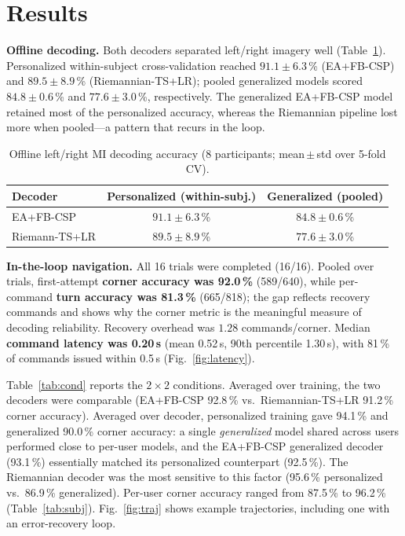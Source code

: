 \documentclass[10pt,journal]{IEEEtran}
\begin{document}
\section{Results}\label{sec:results}
\textbf{Offline decoding.} Both decoders separated left/right imagery well
(Table~\ref{tab:offline}). Personalized within-subject cross-validation reached
$91.1\pm6.3$\,\% (EA+FB-CSP) and $89.5\pm8.9$\,\% (Riemannian-TS+LR); pooled generalized models
scored $84.8\pm0.6$\,\% and $77.6\pm3.0$\,\%, respectively. The generalized EA+FB-CSP model
retained most of the personalized accuracy, whereas the Riemannian pipeline lost more when
pooled---a pattern that recurs in the loop.

\begin{table}[t]\centering
\caption{Offline left/right MI decoding accuracy (8 participants; mean\,$\pm$\,std over 5-fold CV).}
\label{tab:offline}
\begin{tabular}{lcc}
\toprule
Decoder & Personalized (within-subj.) & Generalized (pooled) \\
\midrule
EA+FB-CSP        & $91.1\pm6.3$\,\% & $84.8\pm0.6$\,\% \\
Riemann-TS+LR    & $89.5\pm8.9$\,\% & $77.6\pm3.0$\,\% \\
\bottomrule
\end{tabular}
\end{table}

\textbf{In-the-loop navigation.} All 16 trials were completed (16/16). Pooled over trials, first-attempt \textbf{corner accuracy
was 92.0\,\%} (589/640), while per-command \textbf{turn accuracy was 81.3\,\%} (665/818); the gap
reflects recovery commands and shows why the corner metric is the meaningful measure of decoding
reliability. Recovery overhead was $1.28$ commands/corner. Median \textbf{command latency was
0.20\,s} (mean 0.52\,s, 90th percentile 1.30\,s), with 81\,\% of commands issued within 0.5\,s
(Fig.~\ref{fig:latency}).

Table~\ref{tab:cond} reports the $2{\times}2$ conditions. Averaged over training,
the two decoders were comparable (EA+FB-CSP 92.8\,\% vs.\ Riemannian-TS+LR 91.2\,\% corner
accuracy). Averaged over decoder, personalized training gave 94.1\,\% and generalized 90.0\,\%
corner accuracy: a single \emph{generalized} model shared across users performed close to
per-user models, and the EA+FB-CSP generalized decoder (93.1\,\%) essentially matched its
personalized counterpart (92.5\,\%). The Riemannian decoder was the most sensitive to this
factor (95.6\,\% personalized vs.\ 86.9\,\% generalized). Per-user corner accuracy ranged from
87.5\,\% to 96.2\,\% (Table~\ref{tab:subj}). Fig.~\ref{fig:traj} shows example trajectories,
including one with an error-recovery loop.
\end{document}
